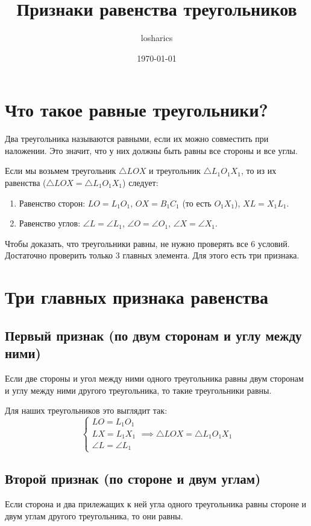 \documentclass[12pt]{article}
\title{Признаки равенства треугольников}
\author{losharics}
\date{\today}
\begin{document}
\maketitle

\section{Что такое равные треугольники?}

Два треугольника называются равными, если их можно совместить при наложении. Это значит, что у них должны быть равны все стороны и все углы.

Если мы возьмем треугольник $\triangle LOX$ и треугольник $\triangle L_1O_1X_1$, то из их равенства ($\triangle LOX = \triangle L_1O_1X_1$) следует:
\begin{enumerate}
    \item Равенство сторон: $LO = L_1O_1$, $OX = B_1C_1$ (то есть $O_1X_1$), $XL = X_1L_1$.
    \item Равенство углов: $\angle L = \angle L_1$, $\angle O = \angle O_1$, $\angle X = \angle X_1$.
\end{enumerate}

Чтобы доказать, что треугольники равны, не нужно проверять все 6 условий. Достаточно проверить только 3 главных элемента. Для этого есть три признака.

\section{Три главных признака равенства}

\subsection{Первый признак (по двум сторонам и углу между ними)}
Если две стороны и угол между ними одного треугольника равны двум сторонам и углу между ними другого треугольника, то такие треугольники равны.

Для наших треугольников это выглядит так:
\[
\begin{cases}
LO = L_1O_1 \\
LX = L_1X_1 \\
\angle L = \angle L_1
\end{cases}
\implies \triangle LOX = \triangle L_1O_1X_1
\]

\subsection{Второй признак (по стороне и двум углам)}
Если сторона и два прилежащих к ней угла одного треугольника равны стороне и двум углам другого треугольника, то они равны.
\end{document}
